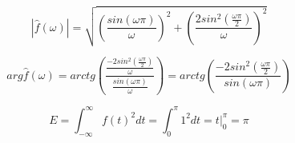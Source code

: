 \documentclass[11pt,a4paper]{article}
\begin{document}
\begin{equation}
|\hat{f} (\omega)| = \sqrt{ (\frac{sin(\omega \pi)}{\omega})^2 + (\frac{2sin^2(\frac{\omega \pi}{2})}{\omega})^2 }
\end{equation}

\begin{equation}
arg \hat{f} (\omega) = arctg (\frac{\frac{-2sin^2(\frac{\omega \pi}{2})}{\omega}}{\frac{sin(\omega \pi)}{\omega}}) = arctg (\frac{-2sin^2(\frac{\omega \pi}{2})}{sin(\omega \pi)})
\end{equation}

\begin{equation}
E = \int_{-\infty}^{\infty} f(t)^2 dt = \int_{0}^{\pi} 1^2 dt = t \Big|^\pi_0 = \pi
\end{equation}
\end{document}
